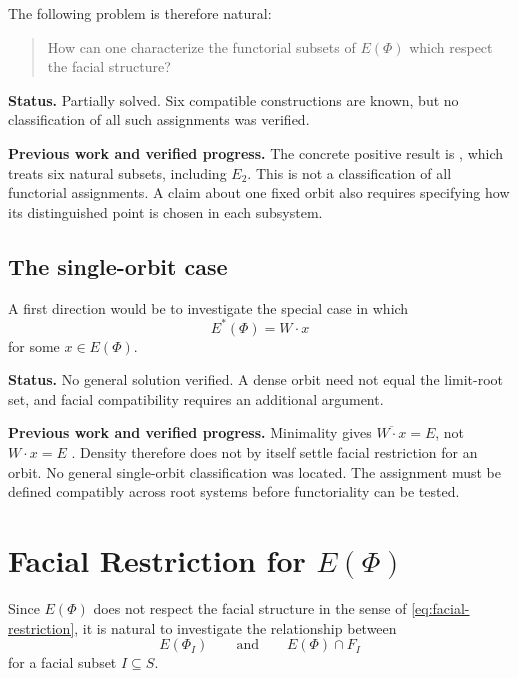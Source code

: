 \documentclass[11pt,reqno]{amsart}
\theoremstyle{plain}
\theoremstyle{definition}
\theoremstyle{remark}
\numberwithin{equation}{section}
\begin{document}
The following problem is therefore natural:

\begin{quote}
How can one characterize the functorial subsets of
$E(\Phi)$ which respect the facial structure?
\end{quote}


\par\medskip
\noindent\textbf{Status.} Partially solved. Six compatible constructions are known, but no classification of all such assignments was verified.

\par\medskip
\noindent\textbf{Previous work and verified progress.}
The concrete positive result is \cite[Theorem~5.20]{DHR}, which treats
six natural subsets, including $E_2$. This is not a classification of
all functorial assignments. A claim about one fixed orbit also requires
specifying how its distinguished point is chosen in each subsystem.

\subsection{The single-orbit case}

A first direction would be to investigate the special
case in which
\[
E^*(\Phi)=W\cdot x
\]
for some $x\in E(\Phi)$.


\par\medskip
\noindent\textbf{Status.} No general solution verified. A dense orbit need not equal the limit-root set, and facial compatibility requires an additional argument.

\par\medskip
\noindent\textbf{Previous work and verified progress.}
Minimality gives $\overline{W\cdot x}=E$, not $W\cdot x=E$
\cite[Theorem~3.1]{DHR}. Density therefore does not by itself settle
facial restriction for an orbit. No general single-orbit classification
was located. The assignment must be defined compatibly across root
systems before functoriality can be tested.

\section{Facial Restriction for \texorpdfstring{$E(\Phi)$}{E(Phi)}}

Since $E(\Phi)$ does not respect the facial structure
in the sense of \eqref{eq:facial-restriction}, it is natural to investigate the
relationship between
\[
E(\Phi_I)
\qquad\text{and}\qquad
E(\Phi)\cap F_I
\]
for a facial subset $I\subseteq S$.
\end{document}
